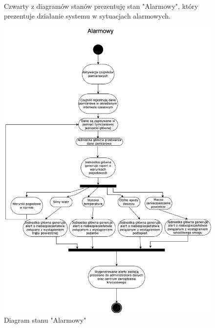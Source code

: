 \documentclass{article}
\begin{document}
\begin{figure}
    \centering
    \begin{minipage}{0.6\textwidth}
        \centering
        \large Czwarty z diagramów stanów prezentuję stan "Alarmowy", który prezentuje działanie systemu w sytuacjach alarmowych.
    \end{minipage}
    \includegraphics[scale=0.5]{alarmowy.png}
    \caption{Diagram stanu "Alarmowy"}
    \label{etykieta4}
\end{figure}
\end{document}
